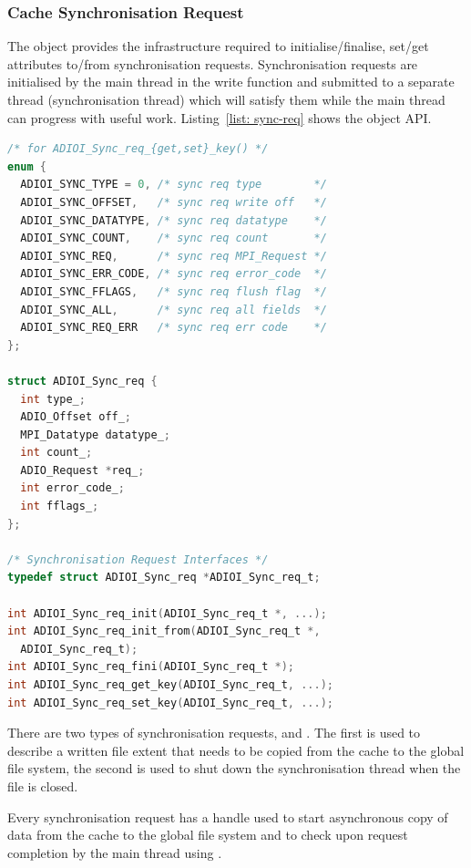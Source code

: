 \subsubsection{Cache Synchronisation Request}
\label{subsubsec: cache-sync-req}
The  object provides the infrastructure required to initialise/finalise, set/get attributes to/from synchronisation requests. Synchronisation requests are initialised by the main thread in the write function and submitted to a separate thread (synchronisation thread) which will satisfy them while the main thread can progress with useful work. Listing~\ref{list: sync-req} shows the object API.

\begin{lstlisting}[language=C, caption=Synchronisation Request API, label={list: sync-req}]
/* for ADIOI_Sync_req_{get,set}_key() */
enum {
  ADIOI_SYNC_TYPE = 0, /* sync req type        */
  ADIOI_SYNC_OFFSET,   /* sync req write off   */
  ADIOI_SYNC_DATATYPE, /* sync req datatype    */
  ADIOI_SYNC_COUNT,    /* sync req count       */
  ADIOI_SYNC_REQ,      /* sync req MPI_Request */
  ADIOI_SYNC_ERR_CODE, /* sync req error_code  */
  ADIOI_SYNC_FFLAGS,   /* sync req flush flag  */
  ADIOI_SYNC_ALL,      /* sync req all fields  */
  ADIOI_SYNC_REQ_ERR   /* sync req err code    */
};

struct ADIOI_Sync_req {
  int type_;
  ADIO_Offset off_;
  MPI_Datatype datatype_;
  int count_;
  ADIO_Request *req_;
  int error_code_;
  int fflags_;
};

/* Synchronisation Request Interfaces */
typedef struct ADIOI_Sync_req *ADIOI_Sync_req_t;

int ADIOI_Sync_req_init(ADIOI_Sync_req_t *, ...);
int ADIOI_Sync_req_init_from(ADIOI_Sync_req_t *, 
  ADIOI_Sync_req_t);
int ADIOI_Sync_req_fini(ADIOI_Sync_req_t *);
int ADIOI_Sync_req_get_key(ADIOI_Sync_req_t, ...);
int ADIOI_Sync_req_set_key(ADIOI_Sync_req_t, ...);
\end{lstlisting}

There are two types of synchronisation requests,  and . The first is used to describe a written file extent that needs to be copied from the cache to the global file system, the second is used to shut down the synchronisation thread when the file is closed.

Every synchronisation request has a  handle used to start asynchronous copy of data from the cache to the global file system and to check upon request completion by the main thread using .

